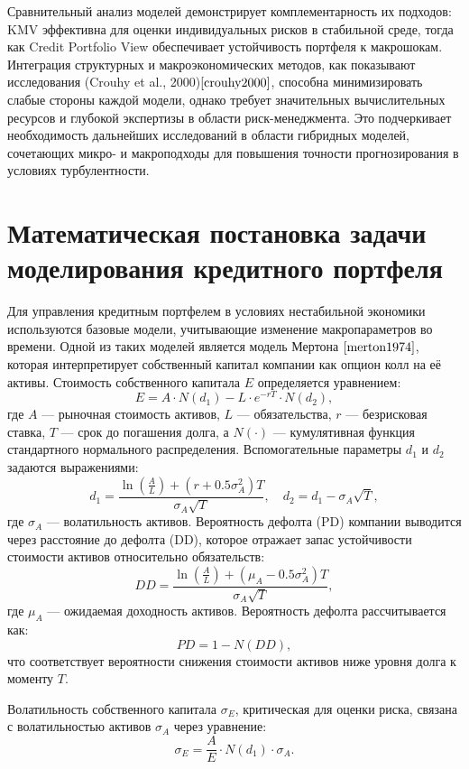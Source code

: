 \documentclass[]{article}
\begin{document}
	Сравнительный анализ моделей демонстрирует комплементарность их подходов: KMV эффективна для оценки индивидуальных рисков в стабильной среде, тогда как Credit Portfolio View обеспечивает устойчивость портфеля к макрошокам. Интеграция структурных и макроэкономических методов, как показывают исследования (Crouhy et al., 2000)$\cite{crouhy2000}$, способна минимизировать слабые стороны каждой модели, однако требует значительных вычислительных ресурсов и глубокой экспертизы в области риск-менеджмента. Это подчеркивает необходимость дальнейших исследований в области гибридных моделей, сочетающих микро- и макроподходы для повышения точности прогнозирования в условиях турбулентности.
	
	
	\section{Математическая постановка задачи моделирования кредитного портфеля}
	

	Для управления кредитным портфелем в условиях нестабильной экономики используются базовые модели, учитывающие изменение макропараметров во времени. Одной из таких моделей является модель Мертона $\cite{merton1974}$, которая интерпретирует собственный капитал компании как опцион колл на её активы. Стоимость собственного капитала \(E\) определяется уравнением:  
	\[
	E = A \cdot N(d_1) - L \cdot e^{-rT} \cdot N(d_2),
	\]  
	где \(A\) — рыночная стоимость активов, \(L\) — обязательства, \(r\) — безрисковая ставка, \(T\) — срок до погашения долга, а \(N(\cdot)\) — кумулятивная функция стандартного нормального распределения. Вспомогательные параметры \(d_1\) и \(d_2\) задаются выражениями:  
	\[
	d_1 = \frac{\ln\left(\frac{A}{L}\right) + \left(r + 0.5\sigma_A^2\right)T}{\sigma_A\sqrt{T}}, \quad d_2 = d_1 - \sigma_A\sqrt{T},
	\]  
	где \(\sigma_A\) — волатильность активов. Вероятность дефолта (PD) компании выводится через расстояние до дефолта (DD), которое отражает запас устойчивости стоимости активов относительно обязательств:  
	\[
	DD = \frac{\ln \left( \frac{A}{L} \right) + (\mu_A - 0.5\sigma_A^2)T}{\sigma_A\sqrt{T}},
	\]  
	где \(\mu_A\) — ожидаемая доходность активов. Вероятность дефолта рассчитывается как:  
	\[
	PD = 1 - N(DD),
	\]  
	что соответствует вероятности снижения стоимости активов ниже уровня долга к моменту \(T\).  
	
	Волатильность собственного капитала \(\sigma_E\), критическая для оценки риска, связана с волатильностью активов \(\sigma_A\) через уравнение:  
	\[
	\sigma_E = \frac{A}{E} \cdot N(d_1) \cdot \sigma_A.
	\]  
	
\end{document}
